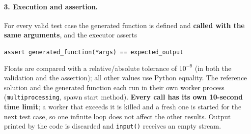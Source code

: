 \documentclass[12pt, a4paper]{article}
\begin{document}
\paragraph{3. Execution and assertion.} For every valid test case the generated function is defined and \textbf{called with the same arguments}, and the executor asserts
\begin{center}
\texttt{assert generated\_function(*args) == expected\_output}
\end{center}
Floats are compared with a relative/absolute tolerance of $10^{-9}$ (in both the validation and the assertion); all other values use Python equality. The reference solution and the generated function each run in their own worker process (\texttt{multiprocessing}, spawn start method). \textbf{Every call has its own 10-second time limit}; a worker that exceeds it is killed and a fresh one is started for the next test case, so one infinite loop does not affect the other results. Output printed by the code is discarded and \texttt{input()} receives an empty stream.
\end{document}
